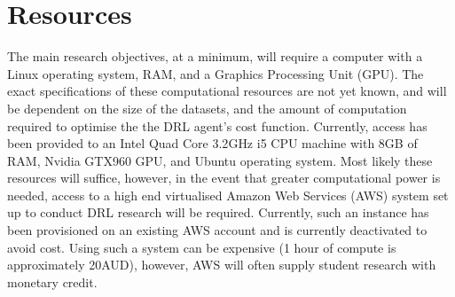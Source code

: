 \documentclass[12pt, a4paper]{article}
\begin{document}
\clearpage

\section{Resources}

The main research objectives, at a minimum, will require a computer with a Linux operating system, RAM, and a Graphics Processing Unit (GPU). The exact specifications of these computational resources are not yet known, and will be dependent on the size of the datasets, and the amount of computation required to optimise the the DRL agent's cost function. Currently, access has been provided to an Intel Quad Core 3.2$\si{\giga\hertz}$ i5 CPU machine with 8GB of RAM, Nvidia GTX960 GPU, and Ubuntu operating system. Most likely these resources will suffice, however, in the event that greater computational power is needed, access to a high end virtualised Amazon Web Services (AWS) system set up to conduct DRL research will be required. Currently, such an instance has been provisioned on an existing AWS account and is currently deactivated to avoid cost. Using such a system can be expensive (1 hour of compute is approximately 20AUD), however, AWS will often supply student research with monetary credit.\\





\end{document}

